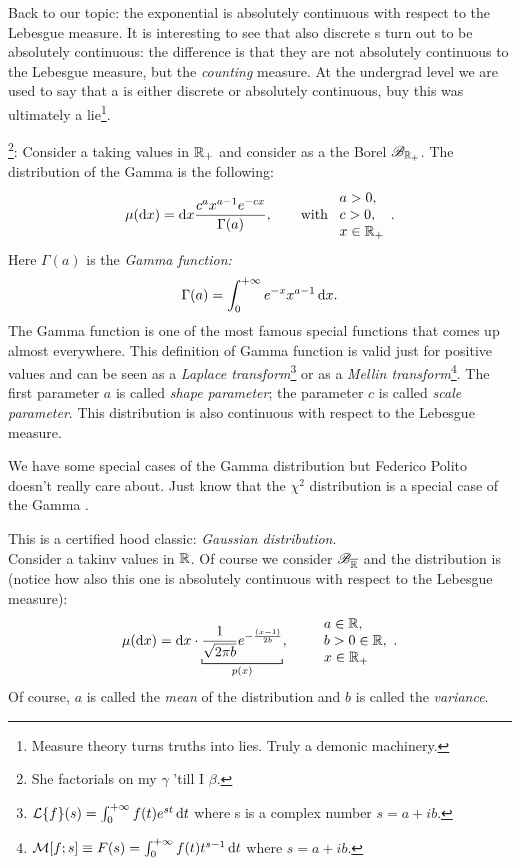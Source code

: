 \documentclass{report}
\begin{document}
Back to our topic: the exponential \rv{} is absolutely continuous with respect to the Lebesgue measure.  
It is interesting to see that also discrete \rv s turn out to be absolutely continuous: the difference is that they are not absolutely continuous to the Lebesgue measure, but the \textit{counting} measure. At the undergrad level we are used to say that a \rv{} is either discrete or absolutely continuous, buy this was ultimately a lie\footnote{Measure theory turns truths into lies. Truly a demonic machinery.}.
\begin{example}
	\footnote{She factorials on my $\gamma$ 'till I $\beta$.}:
	Consider a \rv{} taking values in $\mathbb{R}_+$ and consider as a \sa{} the Borel \sa{} $\mathscr{B}_{\mathbb{R}_+}$. The distribution of the Gamma \rv{} is the following:
	\[\mu(\mathop{}\!\mathrm{d} x)=\mathop{}\!\mathrm{d} x\frac{c^ax^{a-1}e^{-cx}}{\Gamma(a)},\qquad
	\text{with }
	\begin{array}{l}
		a>0,\\
		c>0,\\
		x\in\mathbb{R}_+
	\end{array}.\]
	Here $\Gamma(a)$ is the \textit{Gamma function:}
	\[
	\Gamma(a)=\int_{0}^{+\infty}e^{-x}x^{a-1}\mathop{}\!\mathrm{d} x.
	\]
	The Gamma function is one of the most famous special functions that comes up almost everywhere. This definition of Gamma function is valid just for positive values and can be seen as a \textit{Laplace transform}\footnote{$\mathcal{L}\{f\}(s)=\int_{0}^{+\infty}f(t)e^{st}\mathop{}\!\mathrm{d} t$ where s is a complex number $s=a+ib$.} or as a \textit{Mellin transform}\footnote{$\mathcal{M}[f;s]\equiv F(s)=\int_{0}^{+\infty}f(t)t^{s-1}\mathop{}\!\mathrm{d} t$ where $s=a+ib$.}.
	The first parameter $a$ is called \textit{shape parameter}; the parameter $c$ is called \textit{scale parameter}. This distribution is also continuous with respect to the Lebesgue measure. \par
	We have some special cases of the Gamma distribution but Federico Polito doesn't really care about. Just know that the $\chi^2$ distribution is a special case of the Gamma \rv{}.
\end{example}
\begin{example}
	This is a certified hood classic: \emph{Gaussian distribution}.\\
	Consider a \rv{} takinv values in $\mathbb{R}$. Of course we consider $\mathscr{B}_{\overline{\mathbb{R}}}$ and the distribution is (notice how also this one is absolutely continuous with respect to the Lebesgue measure):
	\[\mu(\dx)=\dx\cdot\underbracket[0.6pt]{\frac{1}{\sqrt{2\pi b}}e^{-\frac{(x-1)}{2b}}}_{\mathclap{p(x)}},\qquad \begin{array}{l}
	a\in\R,\\
	b>0\in\R,\\
	x\in\R_+
	\end{array}.\]
	Of course, $a$ is called the \textit{mean} of the distribution and $b$ is called the \textit{variance}.
\end{example}
\end{document}
